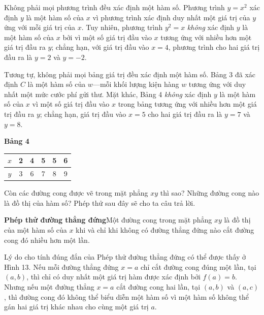 \begin{minipage}[t]{0.708\textwidth}
    \noindent
    Không phải mọi phương trình đều xác định một hàm số. Phương trình $y = x^2$ xác định $y$ là một hàm số của $x$ vì phương trình xác định duy nhất một giá trị của $y$ ứng với mỗi giá trị của $x$. Tuy nhiên, phương trình $y^2 = x$ \emph{không} xác định $y$ là một hàm số của $x$ bởi vì một số giá trị đầu vào $x$ tương ứng với nhiều hơn một giá trị đầu ra $y$; chẳng hạn, với giá trị đầu vào $x = 4$, phương trình cho hai giá trị đầu ra là $y = 2$ và $y = -2$.

    Tương tự, không phải mọi bảng giá trị đều xác định một hàm số. Bảng 3 đã xác định $C$ là một hàm số của $w$---mỗi khối lượng kiện hàng $w$ tương ứng với duy nhất một mức cước phí gửi thư. Mặt khác, Bảng 4 \emph{không} xác định $y$ là một hàm số của $x$ vì một số giá trị đầu vào $x$ trong bảng tương ứng với nhiều hơn một giá trị đầu ra $y$; chẳng hạn, giá trị đầu vào $x = 5$ cho hai giá trị đầu ra là $y = 7$ và $y = 8$.

    \begin{center}
        \textbf{\textsf{Bảng 4}}\\[4pt]
        \renewcommand{\arraystretch}{1.25}
        \begin{tabular}{|c|c|c|c|c|c|}
            \hline
            \rowcolor{stewartcyan!15} $x$ & 2 & 4 & 5 & 5 & 6 \\
            \hline
            \rowcolor{stewartcyan!15} $y$ & 3 & 6 & 7 & 8 & 9 \\
            \hline
        \end{tabular}
    \end{center}

    Còn các đường cong được vẽ trong mặt phẳng $xy$ thì sao? Những đường cong nào là đồ thị của hàm số? Phép thử sau đây sẽ cho ta câu trả lời.

    \vspace{4pt}
    \begin{definitionbox}
        \textbf{\textsf{\color{stewartred}Phép thử đường thẳng đứng}}\quad Một đường cong trong mặt phẳng $xy$ là đồ thị của một hàm số của $x$ khi và chỉ khi không có đường thẳng đứng nào cắt đường cong đó nhiều hơn một lần.
    \end{definitionbox}
    \vspace{4pt}

    Lý do cho tính đúng đắn của Phép thử đường thẳng đứng có thể được thấy ở Hình 13. Nếu mỗi đường thẳng đứng $x = a$ chỉ cắt đường cong đúng một lần, tại $(a, b)$, thì chỉ có duy nhất một giá trị hàm được xác định bởi $f(a) = b$. Nhưng nếu một đường thẳng $x = a$ cắt đường cong hai lần, tại $(a, b)$ và $(a, c)$, thì đường cong đó không thể biểu diễn một hàm số vì một hàm số không thể gán hai giá trị khác nhau cho cùng một giá trị $a$.
\end{minipage}